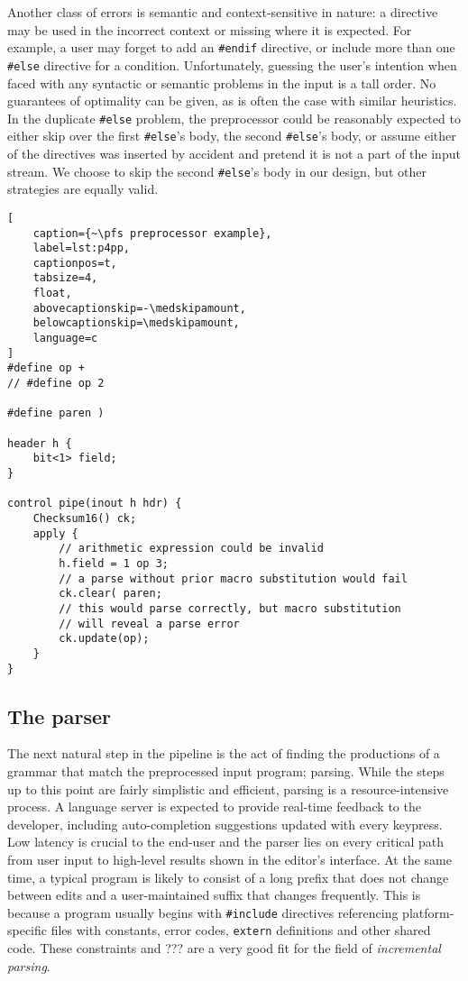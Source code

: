 Another class of errors is semantic and context-sensitive in nature: a directive
may be used in the incorrect context or missing where it is expected. For
example, a user may forget to add an \texttt{\#endif} directive, or include more
than one \texttt{\#else} directive for a condition. Unfortunately, guessing the
user's intention when faced with any syntactic or semantic problems in the input
is a tall order. No guarantees of optimality can be given, as is often the case
with similar heuristics. In the duplicate \texttt{\#else} problem, the
preprocessor could be reasonably expected to either skip over the first
\texttt{\#else}'s body, the second \texttt{\#else}'s body, or assume either of
the directives was inserted by accident and pretend it is not a part of the
input stream. We choose to skip the second \texttt{\#else}'s body in our design,
but other strategies are equally valid.

\begin{lstlisting}[
	caption={~\pfs preprocessor example},
	label=lst:p4pp,
	captionpos=t,
	tabsize=4,
	float,
	abovecaptionskip=-\medskipamount,
	belowcaptionskip=\medskipamount,
	language=c
]
#define op +
// #define op 2

#define paren )

header h {
	bit<1> field;
}

control pipe(inout h hdr) {
	Checksum16() ck;
	apply {
		// arithmetic expression could be invalid
		h.field = 1 op 3;
		// a parse without prior macro substitution would fail
		ck.clear( paren;
		// this would parse correctly, but macro substitution
		// will reveal a parse error
		ck.update(op);
	}
}
\end{lstlisting}


\subsection{The parser}

The next natural step in the pipeline is the act of finding the productions of a
\pfs grammar that match the preprocessed input program; parsing. While the steps
up to this point are fairly simplistic and efficient, parsing is a
resource-intensive process. A language server is expected to provide real-time
feedback to the developer, including auto-completion suggestions updated with
every keypress. Low latency is crucial to the end-user and the
parser lies on every critical path from user input to high-level results shown
in the editor's interface. At the same time, a typical \pfs program is likely to
consist of a long prefix that does not change between edits and a
user-maintained suffix that changes frequently. This is because a \pfs program
usually begins with \texttt{\#include} directives referencing platform-specific
files with constants, error codes, \texttt{extern} definitions and other shared
code. These constraints and ??? are a very good fit for the
field of \emph{incremental parsing}.

